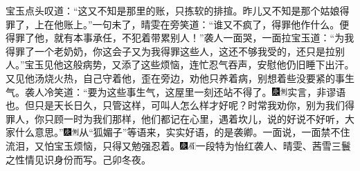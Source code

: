 宝玉点头叹道：“这又不知是那里的账，只拣软的排揎。昨儿又不知是那个姑娘得罪了，上在他账上。”一句未了，晴雯在旁笑道：“谁又不疯了，得罪他作什么。便得罪了他，就有本事承任，不犯着带累别人！”袭人一面哭，一面拉宝玉道：“为我得罪了一个老奶奶，你这会子又为我得罪这些人，这还不够我受的，还只是拉别人。”宝玉见他这般病势，又添了这些烦恼，连忙忍气吞声，安慰他仍旧睡下出汗。又见他汤烧火热，自己守着他，歪在旁边，劝他只养着病，别想着些没要紧的事生气。袭人冷笑道：“要为这些事生气，这屋里一刻还站不得了。{\includegraphics[width=3mm]{../Images/00004}\includegraphics[width=3mm]{../Images/00011}\footnotesize \kaishu 实言，非谬语也。}但只是天长日久，只管这样，可叫人怎么样才好呢？时常我劝你，别为我们得罪人，你只顾一时为我们那样，他们都记在心里，遇着坎儿，说的好说不好听，大家什么意思。”{\includegraphics[width=3mm]{../Images/00004}\includegraphics[width=3mm]{../Images/00011}\footnotesize \kaishu 从“狐媚子”等语来，实实好语，的是袭卿。}一面说，一面禁不住流泪，又怕宝玉烦恼，只得又勉强忍着。{\includegraphics[width=3mm]{../Images/00004}\includegraphics[width=3mm]{../Images/00010}\footnotesize \kaishu 一段特为怡红袭人、晴雯、茜雪三鬟之性情见识身份而写。己卯冬夜。}

